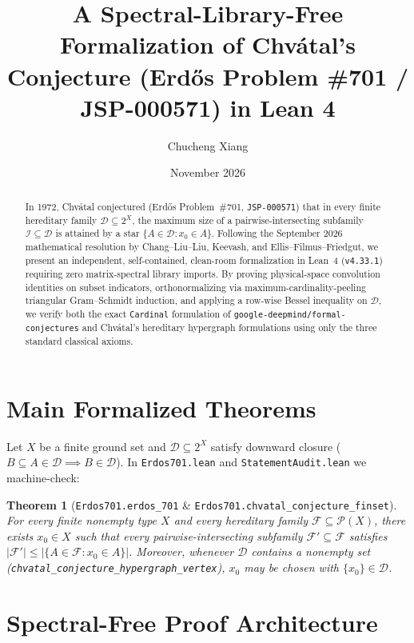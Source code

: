 \documentclass[11pt]{amsart}
\title[Clean-Room Lean 4 Formalization of Chv\'atal's Conjecture]{A Spectral-Library-Free Formalization of Chv\'atal's Conjecture (Erd\H{o}s Problem \#701 / JSP-000571) in Lean 4}
\author{Chucheng Xiang}
\date{November 2026}
\newtheorem{theorem}{Theorem}
\begin{document}
\begin{abstract}
In 1972, Chv\'atal conjectured (Erd\H{o}s Problem~\#701, \texttt{JSP-000571}) that in every finite hereditary family $\mathcal{D} \subseteq 2^X$, the maximum size of a pairwise-intersecting subfamily $\mathcal{I} \subseteq \mathcal{D}$ is attained by a star $\{A \in \mathcal{D} : x_0 \in A\}$. Following the September 2026 mathematical resolution by Chang--Liu--Liu, Keevash, and Ellis--Filmus--Friedgut, we present an independent, self-contained, clean-room formalization in Lean~4 (\texttt{v4.33.1}) requiring zero matrix-spectral library imports. By proving physical-space convolution identities on subset indicators, orthonormalizing via maximum-cardinality-peeling triangular Gram--Schmidt induction, and applying a row-wise Bessel inequality on $\mathcal{D}$, we verify both the exact \texttt{Cardinal} formulation of \texttt{google-deepmind/formal-conjectures} and Chv\'atal's hereditary hypergraph formulations using only the three standard classical axioms.
\end{abstract}

\maketitle

\section{Main Formalized Theorems}

Let $X$ be a finite ground set and $\mathcal{D} \subseteq 2^X$ satisfy downward closure ($B \subseteq A \in \mathcal{D} \implies B \in \mathcal{D}$). In \texttt{Erdos701.lean} and \texttt{StatementAudit.lean} we machine-check:

\begin{theorem}[\texttt{Erdos701.erdos\_701} \& \texttt{Erdos701.chvatal\_conjecture\_finset}]
For every finite nonempty type $X$ and every hereditary family $\mathcal{F} \subseteq \mathcal{P}(X)$, there exists $x_0 \in X$ such that every pairwise-intersecting subfamily $\mathcal{F}' \subseteq \mathcal{F}$ satisfies $|\mathcal{F}'| \le |\{A \in \mathcal{F} : x_0 \in A\}|$. Moreover, whenever $\mathcal{D}$ contains a nonempty set (\texttt{chvatal\_conjecture\_hypergraph\_vertex}), $x_0$ may be chosen with $\{x_0\} \in \mathcal{D}$.
\end{theorem}

\section{Spectral-Free Proof Architecture}
\end{document}
